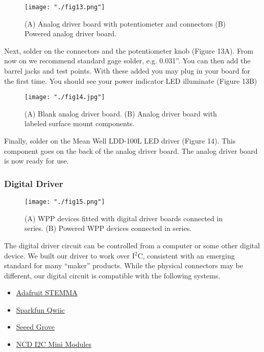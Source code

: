 \documentclass[11pt]{article}
\begin{document}
\begin{figure}[H]
	\centering
	\texttt{[image: "./fig13.png"]}
	\caption{(A) Analog driver board with potentiometer and connectors (B) Powered analog driver board.}
\end{figure}

Next, solder on the connectors and the potentiometer knob (Figure 13A).
From now on we recommend standard gage solder, e.g. 0.031''.
You can then add the barrel jacks and test points.
With these added you may plug in your board for the first time.
You should see your power indicator LED illuminate (Figure 13B)

\begin{figure}[H]
	\centering
	\texttt{[image: "./fig14.jpg"]}
	\caption{(A) Blank analog driver board. (B) Analog driver board with labeled surface mount components.}
\end{figure}

Finally, solder on the Mean Well LDD-100L LED driver (Figure 14).
This component goes on the back of the analog driver board.
The analog driver board is now ready for use.



\subsubsection{Digital Driver} \label{SEC:digital-driver}

\begin{figure}[H]
	\centering
	\texttt{[image: "./fig15.png"]}
	\caption{(A) WPP devices fitted with digital driver boards connected in series. (B) Powered WPP devices connected in series.}
\end{figure}

The digital driver circuit can be controlled from a computer or some other digital device.
We built our driver to work over I$^2$C, consistent with an emerging standard for many ``maker'' products.
While the physical connectors may be different, our digital circuit is compatible with the following systems.

\begin{itemize}
  \item \href{https://learn.adafruit.com/introducing-adafruit-stemma-qt}{Adafruit STEMMA}
  \item \href{https://www.sparkfun.com/qwiic}{Sparkfun Qwiic}
  \item \href{https://www.seeedstudio.com/category/Grove-c-1003.html}{Seeed Grove}
  \item \href{https://store.ncd.io/?fwp_product_type=i2c-mini-modules}{NCD I2C Mini Modules}
\end{itemize}
\end{document}
